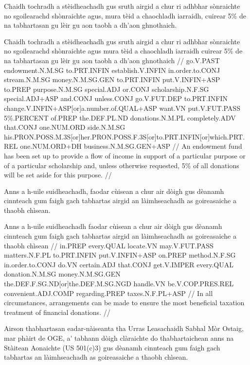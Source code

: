 \documentclass[a4paper,10pt]{article}
\begin{document}
\ex
\begingl
\glpre Chaidh tochradh a stèidheachadh gus sruth airgid a chur ri adhbhar sònraichte no sgoilearachd shònraichte agus, mura tèid a chaochladh iarraidh, cuirear 5\% de na tabhartasan gu lèir gu aon taobh a dh'aon ghnothaich. 

\vspace{4mm}
\gla Chaidh tochradh a stèidheachadh gus sruth airgid a chur ri adhbhar sònraichte no sgoilearachd shònraichte agus mura tèid a chaochladh iarraidh cuirear 5\% de na tabhartasan {gu lèir} gu aon taobh a dh'aon ghnothaich  //
\glb go.V.PAST endowment.N.M.SG to.PRT.INFIN establish.V.INFIN in.order.to.CONJ stream.N.M.SG money.N.M.SG.GEN to.PRT.INFIN put.V.INFIN+ASP to.PREP purpose.N.M.SG special.ADJ or.CONJ scholarship.N.F.SG special.ADJ+ASP and.CONJ unless.CONJ go.V.FUT.DEP to.PRT.INFIN change.V.INFIN+ASP[or]a.number.of.QUAL+ASP want.VN put.V.FUT.PASS 5\%.PERCENT of.PREP the.DEF.PL.ND donations.N.M.PL completely.ADV that.CONJ one.NUM.ORD side.N.M.SG his.PRON.POSS.M.3S[or]her.PRON.POSS.F.3S[or]to.PRT.INFIN[or]which.PRT.REL one.NUM.ORD+DH business.N.M.SG.GEN+ASP  //
\glft An endowment fund has been set up to provide a flow of income in support of a particular purpose or of a particular scholarship and, unless otherwise requested, 5\% of all donations will be set aside for this purpose. //
\endgl
\xe

\ex
\begingl
\glpre Anns a h-uile suidheachadh, faodar cùisean a chur air dòigh gus dèanamh cinnteach gum faigh gach tabhartas airgid an làimhseachadh as goireasaiche a thaobh chìsean. 

\vspace{4mm}
\gla Anns {a h-uile} suidheachadh faodar cùisean a chur air dòigh gus dèanamh cinnteach gum faigh gach tabhartas airgid an làimhseachadh as goireasaiche {a thaobh} chìsean  //
\glb in.PREP every.QUAL locate.VN may.V.FUT.PASS matters.N.F.PL to.PRT.INFIN put.V.INFIN+ASP on.PREP method.N.F.SG in.order.to.CONJ do.VN certain.ADJ that.CONJ get.V.IMPER every.QUAL donation.N.M.SG money.N.M.SG.GEN the.DEF.F.SG.ND[or]the.DEF.M.SG.NGD handle.VN be.V.COP.PRES.REL convenient.ADJ.COMP regarding.PREP taxes.N.F.PL+ASP  //
\glft In all circumstances, arrangements can be made to ensure the most beneficial taxation treatment of financial donations. //
\endgl
\xe

\ex
\begingl
\glpre Airson thabhartasan eadar-nàiseanta tha Urras Leasachaidh Sabhal Mòr Ostaig, mar phàirt de OGE, a' tabhann dòigh clàraichte do thabhartaichean anns na Stàitean Aonaichte (US 501(c)3) gus dèanamh cinnteach gum faigh gach tabhartas an làimhseachadh as goireasaiche a thaobh chìsean. 
\end{document}

